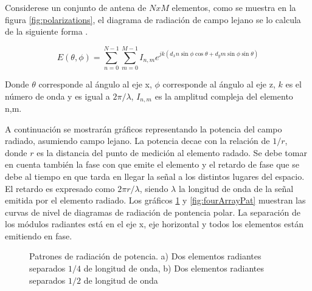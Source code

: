 Considerese un conjunto de antena de $NxM$ elementos, como se muestra en la figura \ref{fig:polarizations}, el diagrama de 
radiación de campo lejano se lo calcula de la siguiente forma \cite{Mahafza2004}.

\begin{equation}
	E(\theta, \phi) = \sum_{n=0}^{N-1}\sum_{m=0}^{M-1} I_{n,m} e^{jk(d_xn\sin\phi\cos\theta + d_ym\sin\phi\sin\theta)}
\end{equation}

Donde $\theta$ corresponde al ángulo al eje x, $\phi$ corresponde al ángulo al eje z, $k$ es el número de onda y es igual 
a $2\pi/\lambda$, $I_{n,m}$ es la amplitud compleja del elemento n,m.

A continuación se mostrarán gráficos representando la potencia del campo radiado, asumiendo campo lejano. La potencia decae 
con la relación de $1/r$, donde $r$ es la distancia del punto de medición al elemento radado. Se debe tomar en cuenta también
la fase con que emite el elemento y el retardo de fase que se debe al tiempo en que tarda en llegar la señal a los distintos 
lugares del espacio. El retardo es expresado como $2\pi r/\lambda$, siendo $\lambda$ la longitud de onda de la señal emitida 
por el elemento radiado. Los gráficos \ref{fig:twoArrayPat} y \ref{fig:fourArrayPat} muestran las curvas de nivel de diagramas 
de radiación de pontencia polar. La separación de los módulos radiantes está en el eje x, eje horizontal y todos los elementos
están emitiendo en fase.

\begin{figure}[H]
	\centering
	\caption{Patrones de radiación de potencia. a) Dos elementos radiantes separados $1/4$ de longitud de onda, b)
	Dos elementos radiantes separados $1/2$ de longitud de onda}
	\label{fig:twoArrayPat}
\end{figure}

